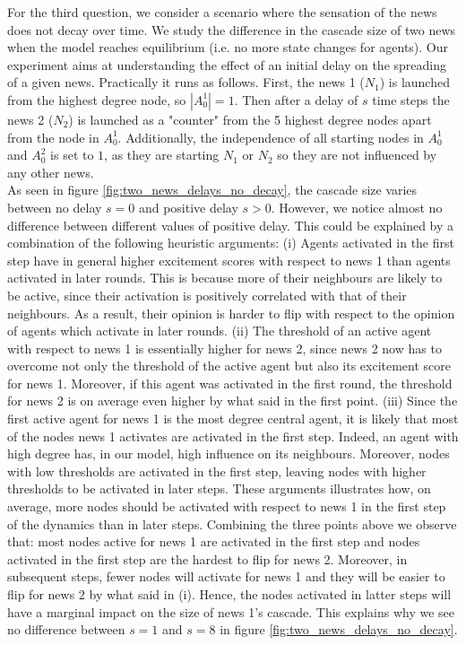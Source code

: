 \documentclass[10pt]{article}
\begin{document}
For the third question, we consider a scenario where the sensation of the news does not decay over time. We study the difference in the cascade size of two news when the model reaches equilibrium (i.e. no more state changes for agents). Our experiment aims at understanding the effect of an initial delay on the spreading of a given news. Practically it runs as follows. First, the news 1 ($N_1$) is launched from the highest degree node, so $|A_0^1|=1$. Then after a delay of $s$ time steps the news 2 ($N_2$) is launched as a "counter" from the 5 highest degree nodes apart from the node in $A_0^1$. Additionally, the independence of all starting nodes in $A_0^1$ and $A_0^2$ is set to $1$, as they are starting $N_1$ or $N_2$ so they are not influenced by any other news. \\

As seen in figure \ref{fig:two_news_delays_no_decay}, the cascade size varies between no delay $s=0$ and positive delay $s>0$. However, we notice almost no difference between different values of positive delay. This could be explained by a combination of the following heuristic arguments: (i) Agents activated in the first step have in general higher excitement scores with respect to news 1 than agents activated in later rounds. This is because more of their neighbours are likely to be active, since their activation is positively correlated with that of their neighbours. As a result, their opinion is harder to flip with respect to the opinion of agents which activate in later rounds. (ii)
The threshold of an active agent with respect to news 1 is essentially higher for news 2, since news 2 now has to overcome not only the threshold of the active agent but also its excitement score for news 1. Moreover, if this agent was activated in the first round, the threshold for news 2 is on average even higher by what said in the first point.  (iii) Since the first active agent for news 1 is the most degree central agent, it is likely that most of the nodes news 1 activates are activated in the first step. Indeed, an agent with high degree has, in our model, high influence on its neighbours.
Moreover, nodes with low thresholds are activated in the first step, leaving nodes with higher thresholds to be activated in later steps. These arguments illustrates how, on average, more nodes should be activated with respect to news 1 in the first step of the dynamics than in later steps. Combining the three points above we observe that: most nodes active for news 1 are activated in the first step and nodes activated in the first step are the hardest to flip for news 2. Moreover, in subsequent steps, fewer nodes will activate for news 1 and they will be easier to flip for news 2 by what said in (i). Hence, the nodes activated in latter steps will have a marginal impact on the size of news 1's cascade. This explains why we see no difference between $s= 1$ and $s=8$ in figure \ref{fig:two_news_delays_no_decay}.
\end{document}
